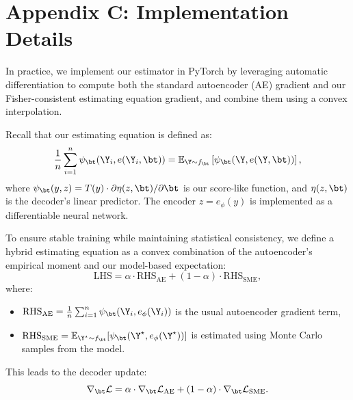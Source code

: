 \section*{Appendix C: Implementation Details}

In practice, we implement our estimator in PyTorch by leveraging automatic differentiation to compute both the standard autoencoder (AE) gradient and our Fisher-consistent estimating equation gradient, and combine them using a convex interpolation.

Recall that our estimating equation is defined as:
\[
\frac{1}{n} \sum_{i=1}^n \psi_\bt(\Y_i, e(\Y_i, \bt)) 
=
\mathbb{E}_{\Y \sim f_\bt} \left[ \psi_\bt(\Y, e(\Y, \bt)) \right],
\]
where \( \psi_\bt(y, z) = T(y) \cdot \partial \eta(z, \bt)/\partial \bt \) is our score-like function, and \( \eta(z, \bt) \) is the decoder's linear predictor. The encoder \( z = e_\phi(y) \) is implemented as a differentiable neural network.

To ensure stable training while maintaining statistical consistency, we define a hybrid estimating equation as a convex combination of the autoencoder's empirical moment and our model-based expectation:
\[
\text{LHS} = \alpha \cdot \text{RHS}_{\text{AE}} + (1 - \alpha) \cdot \text{RHS}_{\text{SME}},
\]
where:
\begin{itemize}
  \item \( \text{RHS}_{\text{AE}} = \frac{1}{n} \sum_{i=1}^n \psi_\bt(\Y_i, e_\phi(\Y_i)) \) is the usual autoencoder gradient term,
  \item \( \text{RHS}_{\text{SME}} = \mathbb{E}_{\Y^\star \sim f_\bt} [\psi_\bt(\Y^\star, e_\phi(\Y^\star))] \) is estimated using Monte Carlo samples from the model.
\end{itemize}

This leads to the decoder update:
\[
\nabla_\bt \mathcal{L} = \alpha \cdot \nabla_\bt \mathcal{L}_{\text{AE}} + (1 - \alpha) \cdot \nabla_\bt \mathcal{L}_{\text{SME}}.
\]

